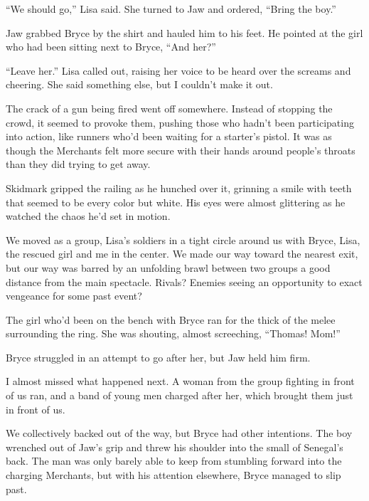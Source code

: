 ``We should go,'' Lisa said.  She turned to Jaw and ordered, ``Bring the boy.''



Jaw grabbed Bryce by the shirt and hauled him to his feet.  He pointed at the girl who had been sitting next to Bryce, ``And her?''



``Leave her.'' Lisa called out, raising her voice to be heard over the screams and cheering.  She said something else, but I couldn't make it out.



The crack of a gun being fired went off somewhere.  Instead of stopping the crowd, it seemed to provoke them, pushing those who hadn't been participating into action, like runners who'd been waiting for a starter's pistol.  It was as though the Merchants felt more secure with their hands around people's throats than they did trying to get away.



Skidmark gripped the railing as he hunched over it, grinning a smile with teeth that seemed to be every color but white.  His eyes were almost glittering as he watched the chaos he'd set in motion.



We moved as a group, Lisa's soldiers in a tight circle around us with Bryce, Lisa, the rescued girl and me in the center.  We made our way toward the nearest exit, but our way was barred by an unfolding brawl between two groups a good distance from the main spectacle.  Rivals?  Enemies seeing an opportunity to exact vengeance for some past event?



The girl who'd been on the bench with Bryce ran for the thick of the melee surrounding the ring.  She was shouting, almost screeching, ``Thomas!  Mom!''



Bryce struggled in an attempt to go after her, but Jaw held him firm.



I almost missed what happened next.  A woman from the group fighting in front of us ran, and a band of young men charged after her, which brought them just in front of us.



We collectively backed out of the way, but Bryce had other intentions.  The boy wrenched out of Jaw's grip and threw his shoulder into the small of Senegal's back.  The man was only barely able to keep from stumbling forward into the charging Merchants, but with his attention elsewhere, Bryce managed to slip past.



